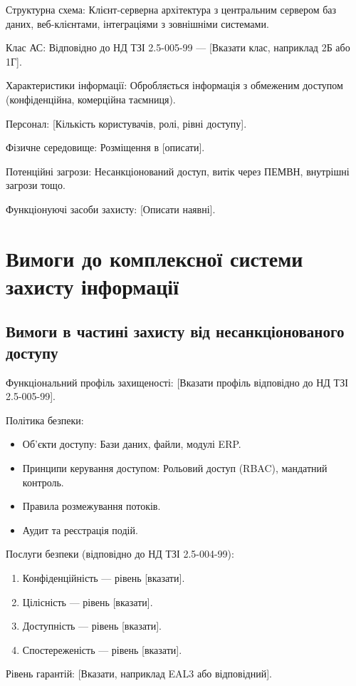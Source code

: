 \documentclass{article}
\begin{document}
Структурна схема: Клієнт-серверна архітектура з центральним сервером баз даних, веб-клієнтами, інтеграціями з зовнішніми системами.

Клас АС: Відповідно до НД ТЗІ 2.5-005-99 — [Вказати клас, наприклад 2Б або 1Г].

Характеристики інформації: Обробляється інформація з обмеженим доступом (конфіденційна, комерційна таємниця).

Персонал: [Кількість користувачів, ролі, рівні доступу].

Фізичне середовище: Розміщення в [описати].

Потенційні загрози: Несанкціонований доступ, витік через ПЕМВН, внутрішні загрози тощо.

Функціонуючі засоби захисту: [Описати наявні].

\section{Вимоги до комплексної системи захисту інформації}

\subsection{Вимоги в частині захисту від несанкціонованого доступу}
Функціональний профіль захищеності: [Вказати профіль відповідно до НД ТЗІ 2.5-005-99].

Політика безпеки:
\begin{itemize}
    \item Об'єкти доступу: Бази даних, файли, модулі ERP.
    \item Принципи керування доступом: Рольовий доступ (RBAC), мандатний контроль.
    \item Правила розмежування потоків.
    \item Аудит та реєстрація подій.
\end{itemize}

Послуги безпеки (відповідно до НД ТЗІ 2.5-004-99):
\begin{enumerate}
    \item Конфіденційність — рівень [вказати].
    \item Цілісність — рівень [вказати].
    \item Доступність — рівень [вказати].
    \item Спостереженість — рівень [вказати].
\end{enumerate}

Рівень гарантій: [Вказати, наприклад EAL3 або відповідний].
\end{document}
